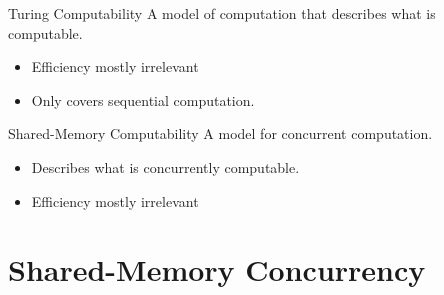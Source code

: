\begin{tcbraster}[raster columns=2, raster equal height]
    \begin{definitionbox}{Turing Computability}
        A model of computation that describes what is computable. 
        \begin{itemize}
            \item Efficiency mostly irrelevant
            \item Only covers sequential computation.
        \end{itemize}
    \end{definitionbox}
    \begin{definitionbox}{Shared-Memory Computability}
        A model for concurrent computation.
        \begin{itemize}
            \item Describes what is concurrently computable.
            \item Efficiency mostly irrelevant
        \end{itemize}
    \end{definitionbox}
\end{tcbraster}

\section{Shared-Memory Concurrency}
